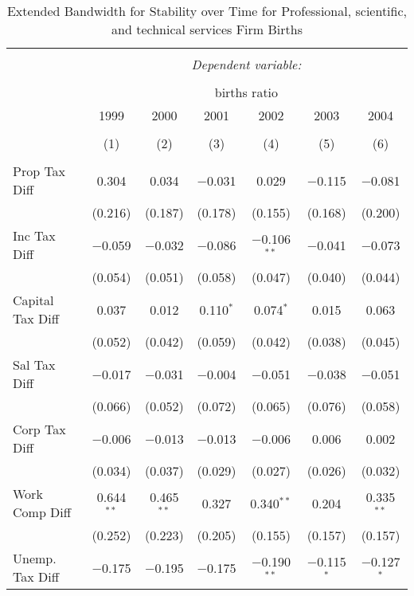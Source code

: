 
\begin{table}[!htbp] \centering 
  \caption{Extended Bandwidth for Stability over Time for  Professional, scientific, and technical services Firm Births} 
  \label{54 ebyear} 
\small 
\begin{tabular}{@{\extracolsep{5pt}}lcccccc} 
\\[-1.8ex]\hline 
\hline \\[-1.8ex] 
 & \multicolumn{6}{c}{\textit{Dependent variable:}} \\ 
\cline{2-7} 
\\[-1.8ex] & \multicolumn{6}{c}{births ratio} \\ 
 & 1999 & 2000 & 2001 & 2002 & 2003 & 2004 \\ 
\\[-1.8ex] & (1) & (2) & (3) & (4) & (5) & (6)\\ 
\hline \\[-1.8ex] 
 Prop Tax Diff & 0.304 & 0.034 & $-$0.031 & 0.029 & $-$0.115 & $-$0.081 \\ 
  & (0.216) & (0.187) & (0.178) & (0.155) & (0.168) & (0.200) \\ 
  Inc Tax Diff & $-$0.059 & $-$0.032 & $-$0.086 & $-$0.106$^{**}$ & $-$0.041 & $-$0.073 \\ 
  & (0.054) & (0.051) & (0.058) & (0.047) & (0.040) & (0.044) \\ 
  Capital Tax Diff & 0.037 & 0.012 & 0.110$^{*}$ & 0.074$^{*}$ & 0.015 & 0.063 \\ 
  & (0.052) & (0.042) & (0.059) & (0.042) & (0.038) & (0.045) \\ 
  Sal Tax Diff & $-$0.017 & $-$0.031 & $-$0.004 & $-$0.051 & $-$0.038 & $-$0.051 \\ 
  & (0.066) & (0.052) & (0.072) & (0.065) & (0.076) & (0.058) \\ 
  Corp Tax Diff & $-$0.006 & $-$0.013 & $-$0.013 & $-$0.006 & 0.006 & 0.002 \\ 
  & (0.034) & (0.037) & (0.029) & (0.027) & (0.026) & (0.032) \\ 
  Work Comp Diff & 0.644$^{**}$ & 0.465$^{**}$ & 0.327 & 0.340$^{**}$ & 0.204 & 0.335$^{**}$ \\ 
  & (0.252) & (0.223) & (0.205) & (0.155) & (0.157) & (0.157) \\ 
  Unemp. Tax Diff & $-$0.175 & $-$0.195 & $-$0.175 & $-$0.190$^{**}$ & $-$0.115$^{*}$ & $-$0.127$^{*}$ \\ 

\end{tabular}
\end{table}
